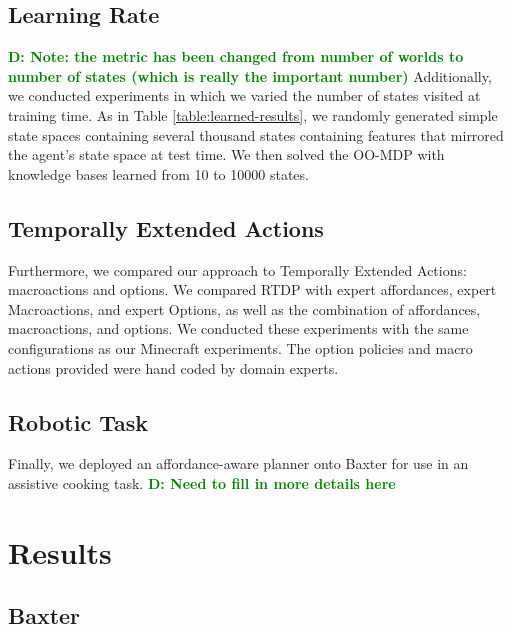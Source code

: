 \documentclass[conference]{IEEEtran}
\newcommand{\dnote}[1]{\textcolor{Green}{\textbf{D: #1}}}
\begin{document}
\subsection{Learning Rate}
\dnote{Note: the metric has been changed from number of worlds to number of states (which is really the important number)}
Additionally, we conducted experiments in which we varied the number of states visited at training time.
As in Table \ref{table:learned-results}, we randomly generated simple state
spaces containing several thousand states containing features that mirrored the agent's state space at test time. We then solved
the OO-MDP with knowledge bases learned from 10 to 10000 states.

\subsection{Temporally Extended Actions}
Furthermore, we compared our approach to Temporally Extended Actions: macroactions and options. We compared RTDP with expert affordances,
expert Macroactions, and expert Options, as well as the combination of affordances, macroactions, and options. We conducted these experiments with the same configurations as our Minecraft experiments. The option policies and macro actions provided were hand coded by domain experts.

\subsection{Robotic Task}
Finally, we deployed an affordance-aware planner onto Baxter for use in an assistive cooking task. \dnote{Need to fill in more details here}

\section{Results}
\label{sec:results}

\subsection{Baxter}
\end{document}
